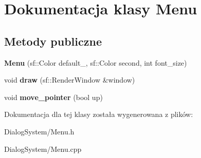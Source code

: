 \hypertarget{class_menu}{\section{Dokumentacja klasy Menu}
\label{class_menu}
}
\subsection*{Metody publiczne}
\begin{DoxyCompactItemize}
\item 
\hypertarget{class_menu_ad9c086bd9613bcd23d6dc5ec600a15f5}{{\bfseries Menu} (sf\-::\-Color default\-\_\-, sf\-::\-Color second, int font\-\_\-size)}\label{class_menu_ad9c086bd9613bcd23d6dc5ec600a15f5}

\item 
\hypertarget{class_menu_a1443dcfd1c1c9844c40658d752c1fbab}{void {\bfseries draw} (sf\-::\-Render\-Window \&window)}\label{class_menu_a1443dcfd1c1c9844c40658d752c1fbab}

\item 
\hypertarget{class_menu_a28db106eeb2454f8699b2b076dab9eaf}{void {\bfseries move\-\_\-pointer} (bool up)}\label{class_menu_a28db106eeb2454f8699b2b076dab9eaf}

\end{DoxyCompactItemize}


Dokumentacja dla tej klasy została wygenerowana z plików\-:\begin{DoxyCompactItemize}
\item 
Dialog\-System/Menu.\-h\item 
Dialog\-System/Menu.\-cpp\end{DoxyCompactItemize}

